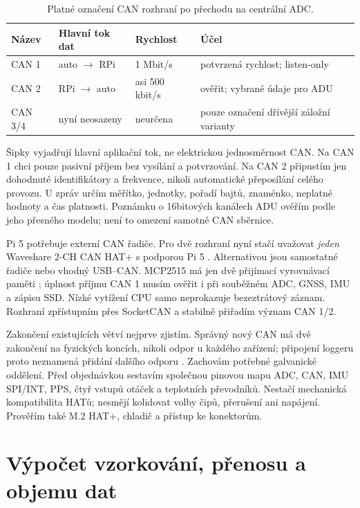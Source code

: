 \begin{table}[htbp]
\centering\small
\caption{Platné označení CAN rozhraní po přechodu na centrální ADC.}
\label{tab:can-role}
\begin{tabularx}{\textwidth}{@{}L{17mm}L{32mm}L{25mm}Y@{}}
\toprule
Název & Hlavní tok dat & Rychlost & Účel \\
\midrule
CAN 1 & auto $\rightarrow$ RPi & 1 Mbit/s & potvrzená rychlost; listen-only \\
CAN 2 & RPi $\rightarrow$ auto & asi 500 kbit/s & ověřit; vybrané údaje pro ADU \\
CAN 3/4 & nyní neosazeny & neurčena & pouze označení dřívější záložní varianty \\
\bottomrule
\end{tabularx}
\end{table}

Šipky vyjadřují hlavní aplikační tok, ne elektrickou jednosměrnost CAN.
Na CAN 1 chci pouze pasivní příjem bez vysílání a potvrzování.
Na CAN 2 připustím jen dohodnuté identifikátory a frekvence, nikoli
automatické přeposílání celého provozu. U zpráv určím měřítko, jednotky,
pořadí bajtů, znaménko, neplatné hodnoty a čas platnosti. Poznámku
o 16bitových kanálech ADU ověřím podle jeho přesného modelu; není
to omezení samotné CAN sběrnice.

Pi 5 potřebuje externí CAN řadiče. Pro dvě rozhraní nyní stačí
uvažovat \emph{jeden} Waveshare 2-CH CAN HAT+ s podporou Pi 5
\cite{waveshare-can-integrace}. Alternativou jsou samostatné řadiče
nebo vhodný USB--CAN. MCP2515 má jen dvě přijímací vyrovnávací paměti
\cite{mcp2515-integrace}; úplnost příjmu CAN 1 musím ověřit i při
souběžném ADC, GNSS, IMU a zápisu SSD. Nízké vytížení CPU samo
neprokazuje bezeztrátový záznam. Rozhraní zpřístupním přes SocketCAN
\cite{socketcan-integrace} a stabilně přiřadím význam CAN 1/2.

Zakončení existujících větví nejprve zjistím. Správný nový CAN má dvě
zakončení na fyzických koncích, nikoli odpor u každého zařízení;
připojení loggeru proto neznamená přidání dalšího odporu
\cite{ti-can-integrace}. Zachovám potřebné galvanické oddělení.
Před objednávkou sestavím společnou pinovou mapu ADC, CAN, IMU SPI/INT,
PPS, čtyř vstupů otáček a teplotních převodníků. Nestačí mechanická
kompatibilita HATů; nesmějí kolidovat volby čipů, přerušení ani
napájení. Prověřím také M.2 HAT+, chladič a přístup ke konektorům.

\section{Výpočet vzorkování, přenosu a objemu dat}
\label{sec:can-vypocet}

